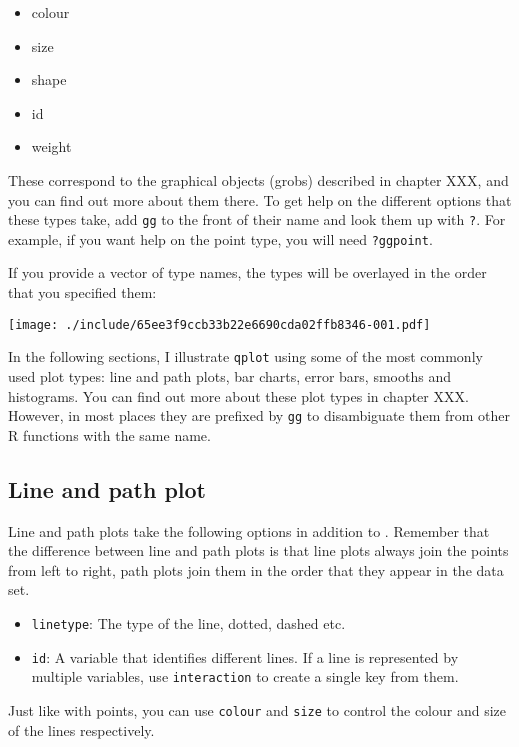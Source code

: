 \begin{itemize}
	\item colour
	\item size
	\item shape
	\item id
	\item weight
\end{itemize}

These correspond to the graphical objects (grobs) described in chapter XXX, and you can find out more about them there.  To get help on the different options that these types take, add {\tt gg} to the front of their name and look them up with {\tt ?}. For example, if you want help on the point type, you will need {\tt ?ggpoint}. 

If you provide a vector of type names, the types will be overlayed in the order that you specified them:

\texttt{[image: ./include/65ee3f9ccb33b22e6690cda02ffb8346-001.pdf]}

In the following sections, I illustrate {\tt qplot} using some of the most commonly used plot types: line and path plots, bar charts, error bars, smooths and histograms.  You can find out more about these plot types in chapter XXX.  However, in most places they are prefixed by {\tt gg} to disambiguate them from other R functions with the same name.

\subsection{Line and path plot}\label{sub:line_plot}

Line and path plots take the following options in addition to .  Remember that the difference between line and path plots is that line plots always join the points from left to right, path plots join them in the order that they appear in the data set.

\begin{itemize}
	\item {\tt linetype}: The type of the line, dotted, dashed etc.
	\item {\tt id}: A variable that identifies different lines.  If a line is represented by multiple variables, use {\tt interaction} to create a single key from them.
\end{itemize}

Just like with points, you can use {\tt colour} and {\tt size} to control the colour and size of the lines respectively.

